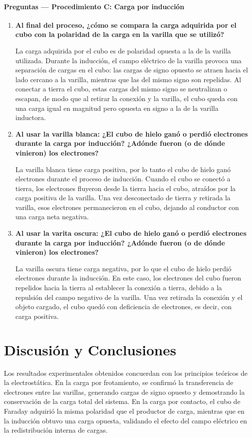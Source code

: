 \documentclass[12pt,a4paper]{article}
\begin{document}
\paragraph{Preguntas --- Procedimiento C: Carga por inducción}
\begin{enumerate}
    \item \textbf{Al final del proceso, ¿cómo se compara la carga adquirida por el cubo con la polaridad de la carga en la varilla que se utilizó?}

    La carga adquirida por el cubo es de polaridad opuesta a la de la varilla utilizada.
    Durante la inducción, el campo eléctrico de la varilla provoca una separación de cargas en el cubo: las cargas de signo opuesto se atraen hacia el lado cercano a la varilla, mientras que las del mismo signo son repelidas. Al conectar a tierra el cubo, estas cargas del mismo signo se neutralizan o escapan, de modo que al retirar la conexión y la varilla, el cubo queda con una carga igual en magnitud pero opuesta en signo a la de la varilla inductora.

    \item \textbf{Al usar la varilla blanca: ¿El cubo de hielo ganó o perdió electrones durante la carga por inducción? ¿Adónde fueron (o de dónde vinieron) los electrones?}

    La varilla blanca tiene carga positiva, por lo tanto el cubo de hielo ganó electrones durante el proceso de inducción.
    Cuando el cubo se conectó a tierra, los electrones fluyeron desde la tierra hacia el cubo, atraídos por la carga positiva de la varilla. Una vez desconectado de tierra y retirada la varilla, esos electrones permanecieron en el cubo, dejando al conductor con una carga neta negativa.

    \item \textbf{Al usar la varita oscura: ¿El cubo de hielo ganó o perdió electrones durante la carga por inducción? ¿Adónde fueron (o de dónde vinieron) los electrones?}

    La varilla oscura tiene carga negativa, por lo que el cubo de hielo perdió electrones durante la inducción.
    En este caso, los electrones del cubo fueron repelidos hacia la tierra al establecer la conexión a tierra, debido a la repulsión del campo negativo de la varilla. Una vez retirada la conexión y el objeto cargado, el cubo quedó con deficiencia de electrones, es decir, con carga positiva.
\end{enumerate}


\section{Discusión y Conclusiones}
Los resultados experimentales obtenidos concuerdan con los principios teóricos de la electrostática. En la carga por frotamiento, se confirmó la transferencia de electrones entre las varillas, generando cargas de signo opuesto y demostrando la conservación de la carga total del sistema. En la carga por contacto, el cubo de Faraday adquirió la misma polaridad que el productor de carga, mientras que en la inducción obtuvo una carga opuesta, validando el efecto del campo eléctrico en la redistribución interna de cargas.
\end{document}
